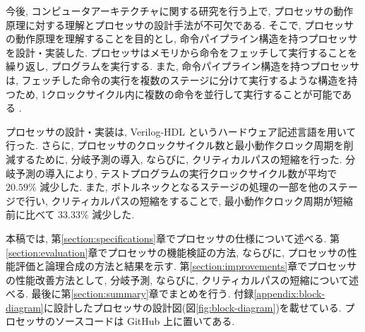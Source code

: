 \documentclass[../main.tex]{subfiles}
\begin{document}
  今後, コンピュータアーキテクチャに関する研究を行う上で, 
  プロセッサの動作原理に対する理解とプロセッサの設計手法が不可欠である.
  そこで, プロセッサの動作原理を理解することを目的とし, 
  命令パイプライン構造を持つプロセッサを設計・実装した.
  プロセッサはメモリから命令をフェッチして実行することを繰り返し, プログラムを実行する.
  また, 命令パイプライン構造を持つプロセッサは, 
  フェッチした命令の実行を複数のステージに分けて実行するような構造を持つため, 
  1クロックサイクル内に複数の命令を並行して実行することが可能である \cite{ca-quantitative-approach}.

  プロセッサの設計・実装は, Verilog-HDL というハードウェア記述言語を用いて行った.
  さらに, プロセッサのクロックサイクル数と最小動作クロック周期を削減するために, 
  分岐予測の導入, ならびに, クリティカルパスの短縮を行った.
  分岐予測の導入により, テストプログラムの実行クロックサイクル数が平均で $20.59\%$ 減少した.
  また, ボトルネックとなるステージの処理の一部を他のステージで行い, 
  クリティカルパスの短縮をすることで, 
  最小動作クロック周期が短縮前に比べて $33.33\%$ 減少した.

  本稿では, 第\ref{section:specifications}章でプロセッサの仕様について述べる.
  第\ref{section:evaluation}章でプロセッサの機能検証の方法, ならびに, プロセッサの性能評価と論理合成の方法と結果を示す.
  第\ref{section:improvements}章でプロセッサの性能改善方法として, 分岐予測, ならびに, クリティカルパスの短縮について述べる.
  最後に第\ref{section:summary}章でまとめを行う.
  付録\ref{appendix:block-diagram}に設計したプロセッサの設計図(図\ref{fig:block-diagram})を載せている.
  プロセッサのソースコードは GitHub \footnotemark 上に置いてある.
\end{document}
